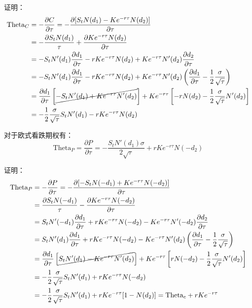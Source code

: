 \documentclass[11pt]{article}
\begin{document}
证明：
\begin{align*}
    \text{Theta}_C &= -\frac{\partial C}{\partial \tau} = - \frac{\partial [S_t N(d_1) - Ke^{-r\tau} N(d_2)]}{\partial \tau} \\ 
    &= -\frac{\partial S_t N(d_1)}{\tau} + \frac{\partial Ke^{-r\tau} N(d_2)}{\partial \tau} \\ 
    &= -S_t N'(d_1)\frac{\partial d_1}{\partial \tau} - rKe^{-r\tau}N(d_2) + Ke^{-r\tau} N'(d_2)\frac{\partial d_2}{\partial \tau} \\
    &= -S_t N'(d_1)\frac{\partial d_1}{\partial \tau} - rKe^{-r\tau} N(d_2) + Ke^{-r\tau}N'(d_2)\left(\frac{\partial d_1}{\partial \tau} -\frac{1}{2}\frac{\sigma}{\sqrt{\tau}} \right) \\
    &= \frac{\partial d_1}{\partial \tau} \left[\cancel{-S_t N'(d_1) + Ke^{-r\tau} N'(d_2) } \right] + Ke^{-r\tau} \left[ -rN(d_2) -\frac{1}{2}\frac{\sigma}{\sqrt{\tau}} N'(d_2)\right] \\
    &=  -\frac{1}{2}\frac{\sigma}{\sqrt{\tau}}S_t N'(d_1) - rKe^{-r\tau} N(d_2)
\end{align*}

对于欧式看跌期权有：
\begin{equation*}
    \text{Theta}_P = \frac{\partial P}{\partial \tau} = -\frac{S_t N'(d_1)\sigma}{2\sqrt{\tau}} + r K e^{-r\tau}N(-d_2)
\end{equation*}

证明：
\begin{align*}
    \text{Theta}_P &= -\frac{\partial P}{\partial \tau} = - \frac{\partial [-S_t N(-d_1) + Ke^{-r\tau} N(-d_2)]}{\partial \tau} \\ 
    &= \frac{\partial S_t N(-d_1)}{\tau} - \frac{\partial Ke^{-r\tau} N(-d_2)}{\partial \tau} \\ 
    &= S_t N'(-d_1)\frac{\partial d_1}{\partial \tau} + rKe^{-r\tau}N(-d_2) - Ke^{-r\tau} N'(-d_2)\frac{\partial d_2}{\partial \tau} \\
    &= S_t N'(d_1)\frac{\partial d_1}{\partial \tau} + r Ke^{-r\tau} N(-d_2) - Ke^{-r\tau}N'(d_2)\left(\frac{\partial d_1}{\partial \tau} -\frac{1}{2}\frac{\sigma}{\sqrt{\tau}} \right) \\
    &= \frac{\partial d_1}{\partial \tau} \left[\cancel{S_t N'(d_1) - Ke^{-r\tau} N'(d_2) } \right] + Ke^{-r\tau} \left[ rN(-d_2) -\frac{1}{2}\frac{\sigma}{\sqrt{\tau}} N'(d_2)\right] \\
    &=  -\frac{1}{2}\frac{\sigma}{\sqrt{\tau}}S_t N'(d_1) + rKe^{-r\tau} N(-d_2) \\
    &=  -\frac{1}{2}\frac{\sigma}{\sqrt{\tau}}S_t N'(d_1) + rKe^{-r\tau}[1- N(d_2) ] = \text{Theta}_c + rKe^{-r\tau}
\end{align*}
\end{document}

